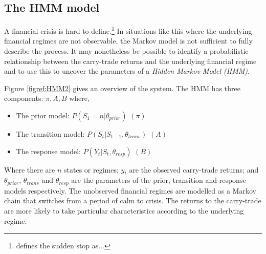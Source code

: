 \documentclass[12pt, a4paper, oneside]{article}\usepackage[]{graphicx}\usepackage[]{color}
\begin{document}
\subsection{The HMM model}
A financial crisis is hard to define.\footnote{\citet{CalvoSS} defines the sudden stop as...}  In situations like this where the underlying financial regimes are not observable, the Markov model is not sufficient to fully describe the process. It may nonetheless be possible to identify a probabilistic relationship between the carry-trade returns and the underlying financial regime and to use this to uncover the parameters of a \emph{Hidden Markov Model (HMM)}. 

Figure \ref{figref:HMM2} gives an overview of the system.  The HMM has three components: $\pi, A, B$ where,

\begin{itemize}
\item The prior model: $P(S_1 = n| \theta_{prior})$ $(\pi)$
\item The transition model: $P(S_t| S_{t-1}, \theta_{trans})$ $(A)$
\item The response model: $P(Y_t| S_t, \theta_{resp})$ $(B)$
\end{itemize}

Where there are $n$ states or regimes; $y_t$ are the observed carry-trade returns; and $\theta_{prior}$, $\theta_{trans}$ and  $\theta_{resp}$ are the parameters of the prior, transition and response models respectively. The unobserved financial regimes are modelled as a Markov chain that switches from a period of calm to crisis.  The returns to the carry-trade are more likely to take particular characteristics according to the underlying regime.   
\end{document}
